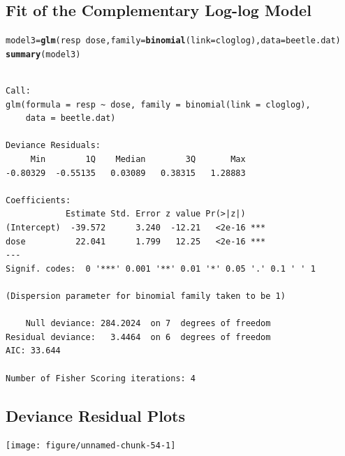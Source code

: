 \documentclass{article}\usepackage[]{graphicx}\usepackage[svgnames]{xcolor}
\makeatletter
\newcommand{\hlopt}[1]{\textcolor[rgb]{0,0,0}{#1}}%
\newcommand{\hlstd}[1]{\textcolor[rgb]{0.345,0.345,0.345}{#1}}%
\newcommand{\hlkwb}[1]{\textcolor[rgb]{0.69,0.353,0.396}{#1}}%
\newcommand{\hlkwc}[1]{\textcolor[rgb]{0.333,0.667,0.333}{#1}}%
\newcommand{\hlkwd}[1]{\textcolor[rgb]{0.737,0.353,0.396}{\textbf{#1}}}%
\newenvironment{kframe}{%
 \def\at@end@of@kframe{}%
 \ifinner\ifhmode%
  \def\at@end@of@kframe{\end{minipage}}%
  \begin{minipage}{\columnwidth}%
 \fi\fi%
 \def\FrameCommand##1{\hskip\@totalleftmargin \hskip-\fboxsep
 \colorbox{shadecolor}{##1}\hskip-\fboxsep
     \hskip-\linewidth \hskip-\@totalleftmargin \hskip\columnwidth}%
 \MakeFramed {\advance\hsize-\width
   \@totalleftmargin\z@ \linewidth\hsize
   \@setminipage}}%
 {\par\unskip\endMakeFramed%
 \at@end@of@kframe}
\newenvironment{knitrout}{}{} %
\makeatother
\begin{document}
\subsection*{Fit of the Complementary Log-log Model}
\begin{knitrout}
\color{fgcolor}\begin{kframe}
\begin{alltt}
\hlstd{model3} \hlkwb{=} \hlkwd{glm}\hlstd{(resp} \hlopt{~} \hlstd{dose,} \hlkwc{family} \hlstd{=} \hlkwd{binomial}\hlstd{(}\hlkwc{link} \hlstd{= cloglog),} \hlkwc{data} \hlstd{= beetle.dat)}
\hlkwd{summary}\hlstd{(model3)}
\end{alltt}
\begin{verbatim}

Call:
glm(formula = resp ~ dose, family = binomial(link = cloglog), 
    data = beetle.dat)

Deviance Residuals: 
     Min        1Q    Median        3Q       Max  
-0.80329  -0.55135   0.03089   0.38315   1.28883  

Coefficients:
            Estimate Std. Error z value Pr(>|z|)    
(Intercept)  -39.572      3.240  -12.21   <2e-16 ***
dose          22.041      1.799   12.25   <2e-16 ***
---
Signif. codes:  0 '***' 0.001 '**' 0.01 '*' 0.05 '.' 0.1 ' ' 1

(Dispersion parameter for binomial family taken to be 1)

    Null deviance: 284.2024  on 7  degrees of freedom
Residual deviance:   3.4464  on 6  degrees of freedom
AIC: 33.644

Number of Fisher Scoring iterations: 4
\end{verbatim}
\end{kframe}
\end{knitrout}
\subsection*{Deviance Residual Plots}
\begin{knitrout}
\color{fgcolor}

{\centering \texttt{[image: figure/unnamed-chunk-54-1]} 

}


\end{knitrout}
\end{document}
